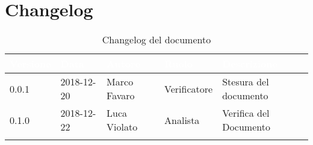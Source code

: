 \newpage

\section{Changelog}

\begin{center}
\begin{longtable}[c]{|m{}|m{}|m{}|m{}|p{}|}
\hline
\rowcolor{bluelogo}\textbf{\textcolor{white}{Versione}} & \textbf{\textcolor{white}{Data}} & \textbf{\textcolor{white}{Autore}} & \textbf{\textcolor{white}{Ruolo}} & \textbf{\textcolor{white}{Descrizione}}\\
\hline \hline
\endfirsthead
0.0.1 & 2018-12-20 & Marco Favaro & Verificatore & Stesura del documento \\
\hline
\rowcolor{grigio} 0.1.0 & 2018-12-22 & Luca Violato & Analista & Verifica del Documento \\
\hline
\caption{Changelog del documento}
\end{longtable}
\end{center}
